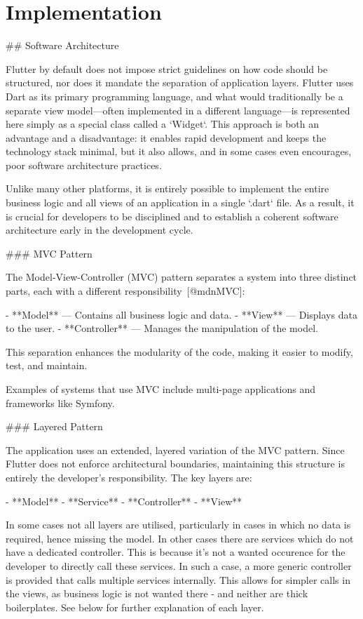 \documentclass[
  digital,     %
  oneside,     %
  nosansbold,  %
  nocolorbold, %
  lof,         %
  lot,         %
]{fithesis4}
\begin{document}
\chapter{Implementation}
\shorthandoff{-}
\begin{markdown}

## Software Architecture

Flutter by default does not impose strict guidelines on how code should be structured, nor does it mandate the separation of application layers. Flutter uses Dart as its primary programming language, and what would traditionally be a separate view model—often implemented in a different language—is represented here simply as a special class called a `Widget`. This approach is both an advantage and a disadvantage: it enables rapid development and keeps the technology stack minimal, but it also allows, and in some cases even encourages, poor software architecture practices.

Unlike many other platforms, it is entirely possible to implement the entire business logic and all views of an application in a single `.dart` file. As a result, it is crucial for developers to be disciplined and to establish a coherent software architecture early in the development cycle.

### MVC Pattern

The Model-View-Controller (MVC) pattern separates a system into three distinct parts, each with a different responsibility~[@mdnMVC]:

- **Model** — Contains all business logic and data.
- **View** — Displays data to the user.
- **Controller** — Manages the manipulation of the model.

This separation enhances the modularity of the code, making it easier to modify, test, and maintain.

Examples of systems that use MVC include multi-page applications and frameworks like Symfony.

### Layered Pattern

The application uses an extended, layered variation of the MVC pattern. Since Flutter does not enforce architectural boundaries, maintaining this structure is entirely the developer's responsibility. The key layers are:

- **Model**
- **Service**
- **Controller**
- **View**

In some cases not all layers are utilised, particularly in cases in which no data is required, hence missing the model. In other cases there are services which do not have a dedicated controller. This is because it's not a wanted occurence for the developer to directly call these services. In such a case, a more generic controller is provided that calls multiple services internally. This allows for simpler calls in the views, as business logic is not wanted there - and neither are thick boilerplates. See below for further explanation of each layer.


\end{markdown}
\end{document}

